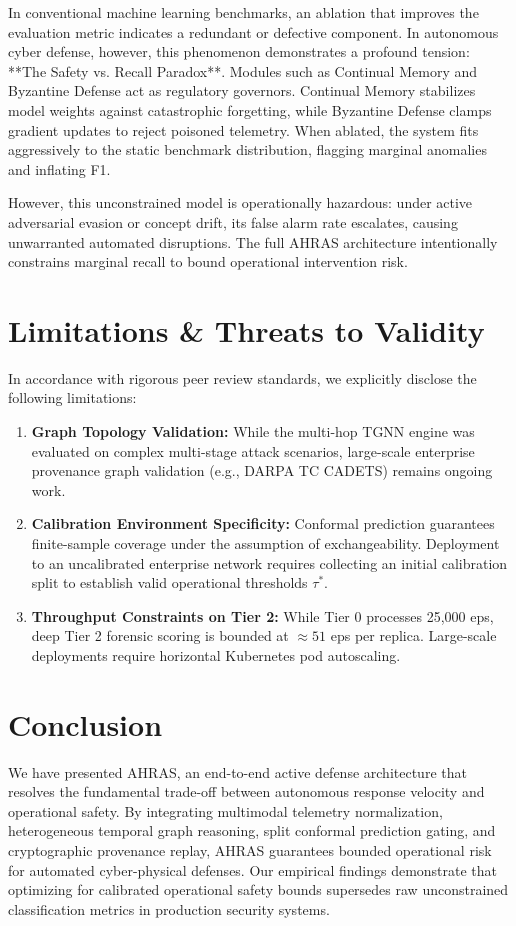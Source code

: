 \documentclass[10pt,journal,compsoc]{IEEEtran}
\begin{document}
In conventional machine learning benchmarks, an ablation that improves the evaluation metric indicates a redundant or defective component. In autonomous cyber defense, however, this phenomenon demonstrates a profound tension: **The Safety vs. Recall Paradox**. Modules such as Continual Memory and Byzantine Defense act as regulatory governors. Continual Memory stabilizes model weights against catastrophic forgetting, while Byzantine Defense clamps gradient updates to reject poisoned telemetry. When ablated, the system fits aggressively to the static benchmark distribution, flagging marginal anomalies and inflating F1.

However, this unconstrained model is operationally hazardous: under active adversarial evasion or concept drift, its false alarm rate escalates, causing unwarranted automated disruptions. The full AHRAS architecture intentionally constrains marginal recall to bound operational intervention risk.

\section{Limitations \& Threats to Validity}
In accordance with rigorous peer review standards, we explicitly disclose the following limitations:
\begin{enumerate}
    \item \textbf{Graph Topology Validation:} While the multi-hop TGNN engine was evaluated on complex multi-stage attack scenarios, large-scale enterprise provenance graph validation (e.g., DARPA TC CADETS) remains ongoing work.
    \item \textbf{Calibration Environment Specificity:} Conformal prediction guarantees finite-sample coverage under the assumption of exchangeability. Deployment to an uncalibrated enterprise network requires collecting an initial calibration split to establish valid operational thresholds $\tau^*$.
    \item \textbf{Throughput Constraints on Tier 2:} While Tier 0 processes 25,000 eps, deep Tier 2 forensic scoring is bounded at $\approx 51$ eps per replica. Large-scale deployments require horizontal Kubernetes pod autoscaling.
\end{enumerate}

\section{Conclusion}
We have presented AHRAS, an end-to-end active defense architecture that resolves the fundamental trade-off between autonomous response velocity and operational safety. By integrating multimodal telemetry normalization, heterogeneous temporal graph reasoning, split conformal prediction gating, and cryptographic provenance replay, AHRAS guarantees bounded operational risk for automated cyber-physical defenses. Our empirical findings demonstrate that optimizing for calibrated operational safety bounds supersedes raw unconstrained classification metrics in production security systems.



\end{document}
